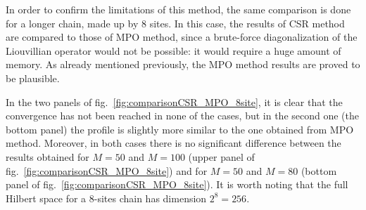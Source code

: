 In order to confirm the limitations of this method, the same comparison is done for a longer chain, made up by 8 sites. In this case, the results of CSR method are compared to those of MPO method, since a brute-force diagonalization of the Liouvillian operator would not be possible: it would require a huge amount of memory. As already mentioned previously, the MPO method results are proved to be plausible.

In the two panels of fig.~\ref{fig:comparisonCSR_MPO_8site}, it is clear that the convergence has not been reached in none of the cases, but in the second one (the bottom panel) the profile is slightly more similar to the one obtained from MPO method. Moreover, in both cases there is no significant difference between the results obtained for $M = 50$ and $M = 100$ (upper panel of fig.~\ref{fig:comparisonCSR_MPO_8site}) and for $M = 50$ and $M = 80$ (bottom panel of fig.~\ref{fig:comparisonCSR_MPO_8site}). It is worth noting that the full Hilbert space for a 8-sites chain has dimension $2^{8} = 256$.

